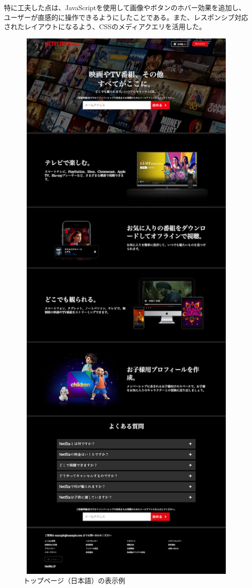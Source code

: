 \documentclass[12pt,a4j]{jarticle}
\begin{document}
特に工夫した点は、JavaScriptを使用して画像やボタンのホバー効果を追加し、ユーザーが直感的に操作できるようにしたことである。また、レスポンシブ対応されたレイアウトになるよう、CSSのメディアクエリを活用した。

\begin{figure}[htbp]
\begin{center}
\includegraphics[width=12cm]{top.png}
\caption{トップページ（日本語）の表示例}\label{fig1}
\end{center}
\end{figure}
\end{document}
